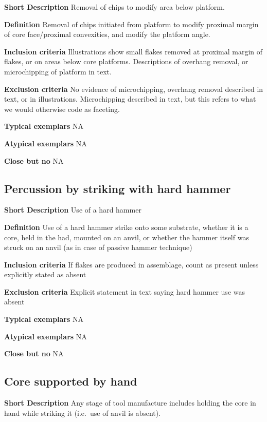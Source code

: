 \documentclass[
]{article}
\begin{document}
\textbf{Short Description} Removal of chips to modify area below
platform.

\textbf{Definition} Removal of chips initiated from platform to modify
proximal margin of core face/proximal convexities, and modify the
platform angle.

\textbf{Inclusion criteria} Illustrations show small flakes removed at
proximal margin of flakes, or on areas below core platforms.
Descriptions of overhang removal, or microchipping of platform in text.

\textbf{Exclusion criteria} No evidence of microchipping, overhang
removal described in text, or in illustrations. Microchipping described
in text, but this refers to what we would otherwise code as faceting.

\textbf{Typical exemplars} NA

\textbf{Atypical exemplars} NA

\textbf{Close but no} NA

\hypertarget{percussion-by-striking-with-hard-hammer}{%
\subsection{Percussion by striking with hard
hammer}\label{percussion-by-striking-with-hard-hammer}}

\textbf{Short Description} Use of a hard hammer

\textbf{Definition} Use of a hard hammer strike onto some substrate,
whether it is a core, held in the had, mounted on an anvil, or whether
the hammer itself was struck on an anvil (as in case of passive hammer
technique)

\textbf{Inclusion criteria} If flakes are produced in assemblage, count
as present unless explicitly stated as absent

\textbf{Exclusion criteria} Explicit statement in text saying hard
hammer use was absent

\textbf{Typical exemplars} NA

\textbf{Atypical exemplars} NA

\textbf{Close but no} NA

\hypertarget{core-supported-by-hand}{%
\subsection{Core supported by hand}\label{core-supported-by-hand}}

\textbf{Short Description} Any stage of tool manufacture includes
holding the core in hand while striking it (i.e.~use of anvil is
absent).
\end{document}
